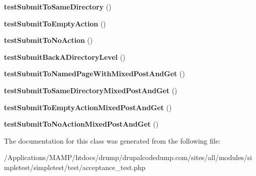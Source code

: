 \begin{DoxyCompactItemize}
\item 
\hypertarget{class_test_of_live_front_controller_emulation_a70ce37564fbabd6dd7b7f49b8414397b}{
{\bfseries testSubmitToSameDirectory} ()}
\label{class_test_of_live_front_controller_emulation_a70ce37564fbabd6dd7b7f49b8414397b}

\item 
\hypertarget{class_test_of_live_front_controller_emulation_ab4fe129f3e06d10b1179fdaded233479}{
{\bfseries testSubmitToEmptyAction} ()}
\label{class_test_of_live_front_controller_emulation_ab4fe129f3e06d10b1179fdaded233479}

\item 
\hypertarget{class_test_of_live_front_controller_emulation_a598f542018dc658194a5b04b105a8924}{
{\bfseries testSubmitToNoAction} ()}
\label{class_test_of_live_front_controller_emulation_a598f542018dc658194a5b04b105a8924}

\item 
\hypertarget{class_test_of_live_front_controller_emulation_aad1fbf0bdde4b8a873531dbb646fa6a3}{
{\bfseries testSubmitBackADirectoryLevel} ()}
\label{class_test_of_live_front_controller_emulation_aad1fbf0bdde4b8a873531dbb646fa6a3}

\item 
\hypertarget{class_test_of_live_front_controller_emulation_a20e491397fdc3ca6d8bd586724213ed8}{
{\bfseries testSubmitToNamedPageWithMixedPostAndGet} ()}
\label{class_test_of_live_front_controller_emulation_a20e491397fdc3ca6d8bd586724213ed8}

\item 
\hypertarget{class_test_of_live_front_controller_emulation_a3e102294987d63aa57cc481d42b5b676}{
{\bfseries testSubmitToSameDirectoryMixedPostAndGet} ()}
\label{class_test_of_live_front_controller_emulation_a3e102294987d63aa57cc481d42b5b676}

\item 
\hypertarget{class_test_of_live_front_controller_emulation_aa9a4e6febecc02f8b5242ba0b394356e}{
{\bfseries testSubmitToEmptyActionMixedPostAndGet} ()}
\label{class_test_of_live_front_controller_emulation_aa9a4e6febecc02f8b5242ba0b394356e}

\item 
\hypertarget{class_test_of_live_front_controller_emulation_a087360823970f7a42ccb951c1ff62ec2}{
{\bfseries testSubmitToNoActionMixedPostAndGet} ()}
\label{class_test_of_live_front_controller_emulation_a087360823970f7a42ccb951c1ff62ec2}

\end{DoxyCompactItemize}


The documentation for this class was generated from the following file:\begin{DoxyCompactItemize}
\item 
/Applications/MAMP/htdocs/drump/drupalcodedump.com/sites/all/modules/simpletest/simpletest/test/acceptance\_\-test.php\end{DoxyCompactItemize}
